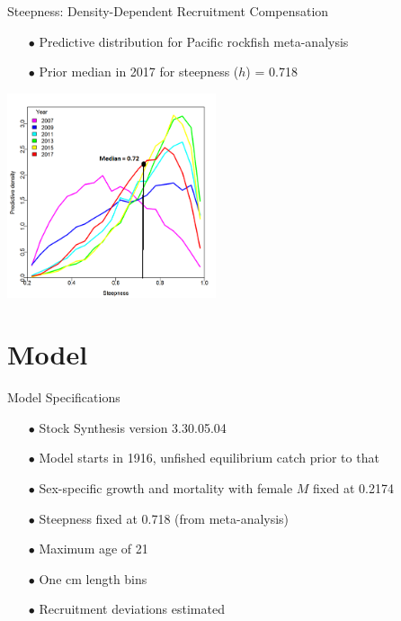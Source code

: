 \documentclass[ignorenonframetext,]{beamer}
\begin{document}
\begin{frame}{Steepness: Density-Dependent Recruitment Compensation}

\begin{itemize}
\item[$\bullet$] Predictive distribution for Pacific rockfish meta-analysis
\item[$\bullet$] Prior median in 2017 for steepness ($h$) = 0.718
\end{itemize}

\centering
\includegraphics[height=6cm]{Figures/h_prior.png}

\end{frame}

\section{Model}\label{model}

\begin{frame}{Model Specifications}

\begin{itemize}
\item[$\bullet$] Stock Synthesis version 3.30.05.04
\item[$\bullet$] Model starts in 1916, unfished equilibrium catch prior to that
\item[$\bullet$] Sex-specific growth and mortality with female $M$ fixed at 0.2174
\item[$\bullet$] Steepness fixed at 0.718 (from meta-analysis)
\item[$\bullet$] Maximum age of 21
\item[$\bullet$] One cm length bins
\item[$\bullet$] Recruitment deviations estimated
\end{itemize}

\end{frame}
\end{document}
